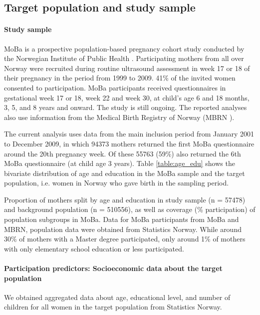 \documentclass[12pt]{article}
\begin{document}
\subsection{Target population and study sample}

\paragraph{Study sample} MoBa is a prospective population-based pregnancy cohort study conducted by the Norwegian Institute of Public Health  \cite{Magnus2006-jj,Magnus2016-ht}. Participating mothers from all over Norway were recruited during routine ultrasound assessment in week 17 or 18 of their pregnancy in the period from 1999 to 2009. 41\% of the invited women consented to participation. MoBa participants received questionnaires in gestational week 17 or 18, week 22 and week 30, at child's age 6 and 18 months, 3, 5, and 8 years and onward. The study is still ongoing. The reported analyses also use information from the Medical Birth Registry of Norway (MBRN \cite{Irgens2000-ra}).

The current analysis uses data from the main inclusion period from January 2001 to December 2009, in which 94373 mothers returned the first MoBa questionnaire around the 20th pregnancy week. Of these 55763 (59\%) also returned the 6th MoBa questionnaire (at child age 3 years). Table \ref{table:age_edu} shows the bivariate distribution of age and education in the MoBa sample and the target population, i.e. women in Norway who gave birth in the sampling period.

\begin{table}[ht]
	\caption{Proportion of mothers split by age and education in study sample (n = 57478) and background population (n = 510556), as well as coverage (\% participation) of population subgroups in MoBa. Data for MoBa participants from MoBa and MBRN, population data were obtained from Statistics Norway. While around 30\% of mothers with a Master degree participated, only around 1\% of mothers with only elementary school education or less participated.} 
	\label{table:age_edu}
\end{table}

\paragraph{Participation predictors: Socioeconomic data about the target population}
We obtained aggregated data about age, educational level, and number of children for all women in the target population from Statistics Norway. 
\end{document}
